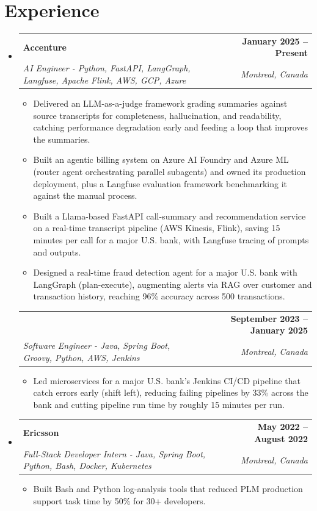 \documentclass[letterpaper,11pt]{article}
\makeatletter
\newcommand{\resumeItem}[1]{
  \item\small{{#1 \vspace{-2pt}}}
}
\newcommand{\resumeSubheading}[4]{
  \vspace{-2pt}\item
    \begin{tabular*}{1.0\textwidth}[t]{l@{\extracolsep{\fill}}r}
      \textbf{#1} & \textbf{\small #2} \\
      \textit{\small#3} & \textit{\small #4} \\
    \end{tabular*}\vspace{-7pt}
}
\newcommand{\resumeSubheadingContinued}[3]{
  \vspace{4pt}
    \begin{tabular*}{1.0\textwidth}[t]{l@{\extracolsep{\fill}}r}
      & \textbf{\small #2} \\
      \textit{\small#1} & \textit{\small #3} \\
    \end{tabular*}\vspace{-7pt}
}
\newcommand{\resumeSubHeadingListStart}{\begin{itemize}[leftmargin=0.0in, label={}]}
\newcommand{\resumeSubHeadingListEnd}{\end{itemize}}
\newcommand{\resumeItemListStart}{\begin{itemize}}
\newcommand{\resumeItemListEnd}{\end{itemize}\vspace{-5pt}}
\makeatother
\begin{document}
\section{Experience}
  \resumeSubHeadingListStart

    \resumeSubheading
      {Accenture}{January 2025 -- Present}
      {AI Engineer - Python, FastAPI, LangGraph, Langfuse, Apache Flink, AWS, GCP, Azure}{Montreal, Canada}
      \resumeItemListStart
        \resumeItem{Delivered an LLM-as-a-judge framework grading summaries against source transcripts for completeness, hallucination, and readability, catching performance degradation early and feeding a loop that improves the summaries.}
        \resumeItem{Built an agentic billing system on Azure AI Foundry and Azure ML (router agent orchestrating parallel subagents) and owned its production deployment, plus a Langfuse evaluation framework benchmarking it against the manual process.}
        \resumeItem{Built a Llama-based FastAPI call-summary and recommendation service on a real-time transcript pipeline (AWS Kinesis, Flink), saving 15 minutes per call for a major U.S. bank, with Langfuse tracing of prompts and outputs.}
        \resumeItem{Designed a real-time fraud detection agent for a major U.S. bank with LangGraph (plan-execute), augmenting alerts via RAG over customer and transaction history, reaching 96\% accuracy across 500 transactions.}
      \resumeItemListEnd
      \vspace{-8pt}

    \resumeSubheadingContinued
      {Software Engineer - Java, Spring Boot, Groovy, Python, AWS, Jenkins}{September 2023 -- January 2025}{Montreal, Canada}
      \resumeItemListStart
        \resumeItem{Led microservices for a major U.S. bank's Jenkins CI/CD pipeline that catch errors early (shift left), reducing failing pipelines by 33\% across the bank and cutting pipeline run time by roughly 15 minutes per run.}
      \resumeItemListEnd

    \resumeSubheading
      {Ericsson}{May 2022 -- August 2022}
      {Full-Stack Developer Intern - Java, Spring Boot, Python, Bash, Docker, Kubernetes}{Montreal, Canada}
      \resumeItemListStart
        \resumeItem{Built Bash and Python log-analysis tools that reduced PLM production support task time by 50\% for 30+ developers.}
      \resumeItemListEnd

  \resumeSubHeadingListEnd
\vspace{-14pt}

\end{document}
